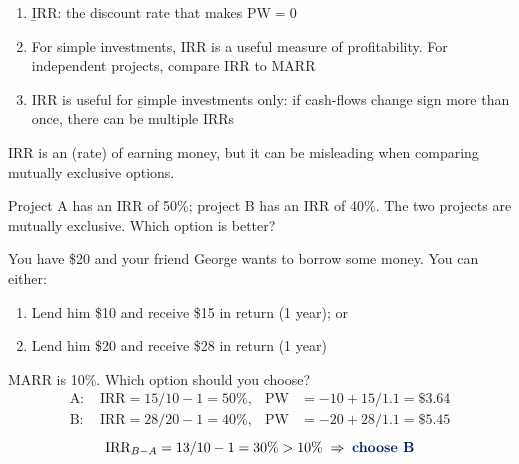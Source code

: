 \begin{enumerate}
    \item \b{IRR}: the discount rate that makes $\text{PW} = 0$
    \item For simple investments, IRR is a useful measure of profitability. For independent projects, compare IRR to MARR
    \item IRR is useful for \b{simple investments only}: if cash-flows change sign more than once, there can be multiple IRRs
\end{enumerate}


IRR is an  (rate) of earning money, but it can be
misleading when comparing mutually exclusive options.

\begin{example}
    Project A has an IRR of 50\%; project B has an IRR of 40\%. The two
    projects are mutually exclusive. Which option is better?
    \\
\end{example}

\begin{example}
    You have \$20 and your friend George wants to borrow some money. You
    can either:
    \begin{enumerate}[label = \Alph*.]
        \item Lend him \$10 and receive \$15 in return (1 year); or
        \item Lend him \$20 and receive \$28 in return (1 year)
    \end{enumerate}
    MARR is 10\%. Which option should you choose?
    \begin{align*}
        \text{A: } & \text{IRR} = 15/10 - 1 = 50\%, & \text{PW} &= -10 + 15/1.1 = \$3.64\\
        \text{B: } & \text{IRR} = 28/20 - 1 = 40\%, & \text{PW} &= -20 + 28/1.1 = \$5.45
    \end{align*}
    \[\text{IRR}_{B-A} = 13/10 - 1 = 30\% > 10\% \;\Rightarrow\; \dbb{choose B}\]
\end{example}

